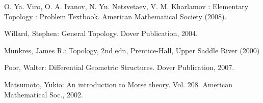 \documentclass[a4paper]{article}
\theoremstyle{remark}
\begin{document}
\begin{thebibliography}{9}
 O. Ya. Viro, O. A. Ivanov, N. Yu. Netsvetaev, V. M. Kharlamov : Elementary Topology : Problem Textbook. American Mathematical Society (2008).

Willard, Stephen: General Topology. Dover Publication, 2004.

Munkres, James R.: Topology, 2nd edn, Prentice-Hall, Upper Saddle River (2000)

Poor, Walter: Differential Geometric Structures. Dover Publication, 2007.

Matsumoto, Yukio: An introduction to Morse theory. Vol. 208. American Mathematical Soc., 2002.



\end{thebibliography}
\end{document}
